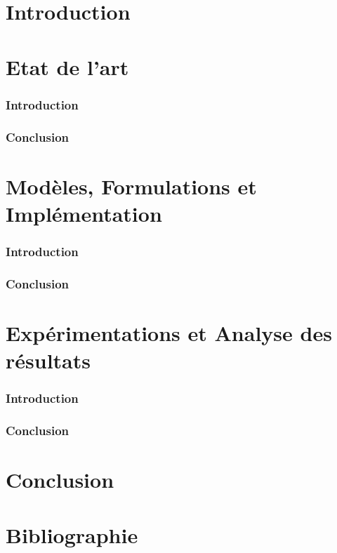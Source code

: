 \documentclass[10pt,a4paper]{article}
\begin{document}
	\part*{Introduction}
	
	\newpage
	
	\part{Etat de l'art}
		\section*{Introduction}
		\section*{Conclusion}
		
	\newpage
	
	\part{Modèles, Formulations et Implémentation}
		\section*{Introduction}
		\section*{Conclusion}
		
	\newpage
	
	\part{Expérimentations et Analyse des résultats}
		\section*{Introduction}
		\section*{Conclusion}
		
	\newpage
		
	\part*{Conclusion}
	
	\part*{Bibliographie}
\end{document}
